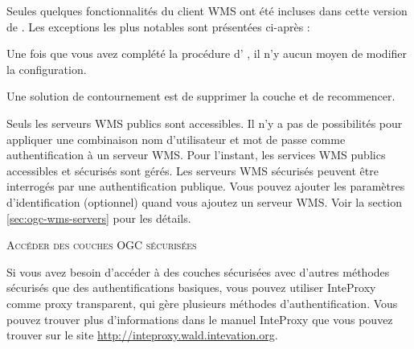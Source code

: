 Seules quelques fonctionnalités du client WMS ont été incluses dans cette version de \qg. Les exceptions les plus notables sont présentées ci-après :


Une fois que vous avez complété la procédure d' , il n'y aucun moyen de modifier la configuration.

Une solution de contournement est de supprimer la couche et de recommencer.


Seuls les serveurs WMS publics sont accessibles. Il n'y a pas de possibilités pour appliquer une combinaison nom d'utilisateur et mot de passe comme authentification à un serveur WMS. Pour l'instant, les services WMS publics accessibles et sécurisés sont gérés. Les serveurs WMS sécurisés peuvent être interrogés par une authentification publique. Vous pouvez  ajouter les paramètres d'identification (optionnel) quand vous ajoutez un serveur WMS. Voir la section  \ref{sec:ogc-wms-servers} pour les détails.


\begin{Tip}[ht]\caption{\textsc{Accéder des couches OGC sécurisées}}
Si vous avez besoin d'accéder à des couches sécurisées avec d'autres méthodes sécurisés que des authentifications basiques, vous pouvez utiliser InteProxy comme proxy transparent, qui gère plusieurs méthodes d'authentification. Vous pouvez trouver plus d'informations dans le manuel InteProxy que vous pouvez trouver sur le site \url{http://inteproxy.wald.intevation.org}. 
\end{Tip}

